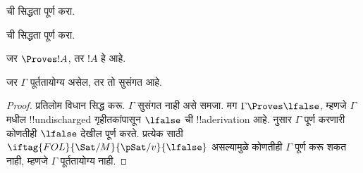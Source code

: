 \documentclass[../../../include/open-logic-section]{subfiles}
\begin{document}
\begin{prob}
 ची सिद्धता पूर्ण करा.
\end{prob}
\tagendprob

\begin{prob}
 ची सिद्धता पूर्ण करा.
\end{prob}
\tagendprob

\begin{cor}
जर $\Proves !A$, तर $!A$ हे  आहे.
\end{cor}

\begin{cor}
जर $\Gamma$ पूर्ततायोग्य असेल, तर तो सुसंगत आहे.
\end{cor}

\begin{proof}
प्रतिलोम विधान सिद्ध करू. $\Gamma$ सुसंगत नाही असे समजा. मग
$\Gamma \Proves \lfalse$, म्हणजे $\Gamma$ मधील !!{undischarged}
गृहीतकांपासून $\lfalse$ ची !!a{derivation} आहे. 
नुसार $\Gamma$ पूर्ण करणारी कोणतीही
$\lfalse$ देखील पूर्ण करते. प्रत्येक
साठी $\iftag{FOL}{\Sat/{M}}{\pSat/{v}}{\lfalse}$ असल्यामुळे कोणतीही
 $\Gamma$ पूर्ण करू शकत नाही,
म्हणजे $\Gamma$ पूर्ततायोग्य नाही.
\end{proof}
\end{document}
